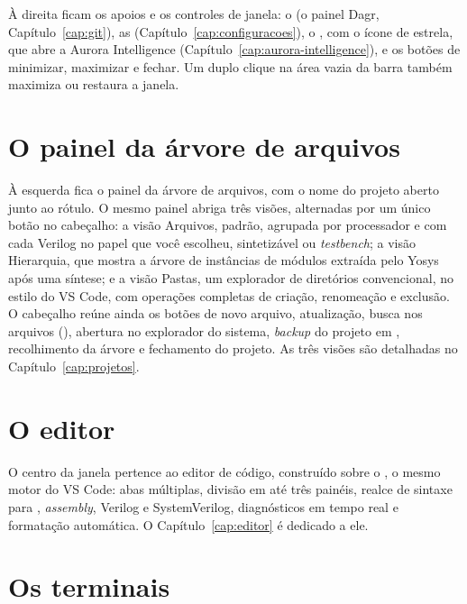 À direita ficam os apoios e os controles de janela: o  (o painel Dagr, Capítulo~\ref{cap:git}), as  (Capítulo~\ref{cap:configuracoes}), o , com o ícone de estrela, que abre a Aurora Intelligence (Capítulo~\ref{cap:aurora-intelligence}), e os botões de minimizar, maximizar e fechar. Um duplo clique na área vazia da barra também maximiza ou restaura a janela.


\section{O painel da árvore de arquivos}

À esquerda fica o painel da árvore de arquivos, com o nome do projeto aberto junto ao rótulo. O mesmo painel abriga três visões, alternadas por um único botão no cabeçalho: a visão Arquivos, padrão, agrupada por processador e com cada Verilog no papel que você escolheu, sintetizável ou \textit{testbench}; a visão Hierarquia, que mostra a árvore de instâncias de módulos extraída pelo Yosys após uma síntese; e a visão Pastas, um explorador de diretórios convencional, no estilo do VS Code, com operações completas de criação, renomeação e exclusão. O cabeçalho reúne ainda os botões de novo arquivo, atualização, busca nos arquivos (), abertura no explorador do sistema, \textit{backup} do projeto em , recolhimento da árvore e fechamento do projeto. As três visões são detalhadas no Capítulo~\ref{cap:projetos}.

\section{O editor}

O centro da janela pertence ao editor de código, construído sobre o , o mesmo motor do VS Code: abas múltiplas, divisão em até três painéis, realce de sintaxe para \cmm{}, \textit{assembly}, Verilog e SystemVerilog, diagnósticos em tempo real e formatação automática. O Capítulo~\ref{cap:editor} é dedicado a ele.

\section{Os terminais}

